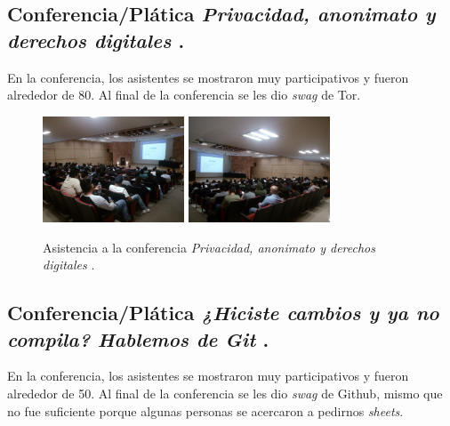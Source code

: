 \documentclass[a4paper,11pt]{article}                 %
\begin{document}
  \subsection{Conferencia/Plática \textit{Privacidad, anonimato y derechos digitales} .}     
  En la conferencia, los asistentes se mostraron muy participativos y fueron alrededor de 80. Al final de la conferencia se les dio \textit{swag} de Tor.
             \begin{figure}[H]
    \begin{center}
      \includegraphics[width=0.375\textwidth]{images/tor-02}
      \includegraphics[width=0.375\textwidth]{images/tor-01}
      \caption{Asistencia a la conferencia  \textit{ Privacidad, anonimato y derechos digitales} .}
      \label{fig:tor}
    \end{center}
  \end{figure}  
  
  
  \subsection{Conferencia/Plática \textit{ ¿Hiciste cambios y ya no compila? Hablemos de Git} .} 
    En la conferencia, los asistentes se mostraron muy participativos y fueron alrededor de 50. Al final de la conferencia se les dio \textit{swag} de Github, mismo que no fue suficiente porque algunas personas se acercaron a pedirnos \textit{sheets}.
  
\end{document}
